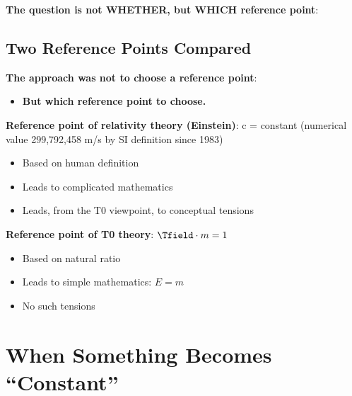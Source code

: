 	\textbf{The question is not WHETHER, but WHICH reference point}:
	
	\begin{table}[htbp]
		\centering
		\caption{Reference point systems comparison}
	\end{table}
	
	\subsection{Two Reference Points Compared}
	
	\textbf{The approach was not to choose a reference point}:
	\begin{itemize}
		\item \textbf{But which reference point to choose.}
	\end{itemize}
	
	\textbf{Reference point of relativity theory (Einstein)}: c = constant (numerical value 299,792,458 m/s by SI definition since 1983)
	\begin{itemize}
		\item Based on human definition
		\item Leads to complicated mathematics
		\item Leads, from the T0 viewpoint, to conceptual tensions
	\end{itemize}
	
	\textbf{Reference point of T0 theory}: $\Tfield \cdot m = 1$
	\begin{itemize}
		\item Based on natural ratio
		\item Leads to simple mathematics: $E = m$
		\item No such tensions
	\end{itemize}
	
	\section{When Something Becomes ``Constant''}
	
